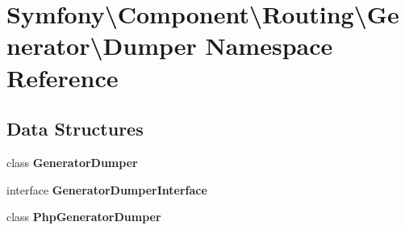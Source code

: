 \section{Symfony\textbackslash{}Component\textbackslash{}Routing\textbackslash{}Generator\textbackslash{}Dumper Namespace Reference}
\label{namespace_symfony_1_1_component_1_1_routing_1_1_generator_1_1_dumper}
\subsection*{Data Structures}
\begin{DoxyCompactItemize}
\item 
class {\bf Generator\+Dumper}
\item 
interface {\bf Generator\+Dumper\+Interface}
\item 
class {\bf Php\+Generator\+Dumper}
\end{DoxyCompactItemize}
